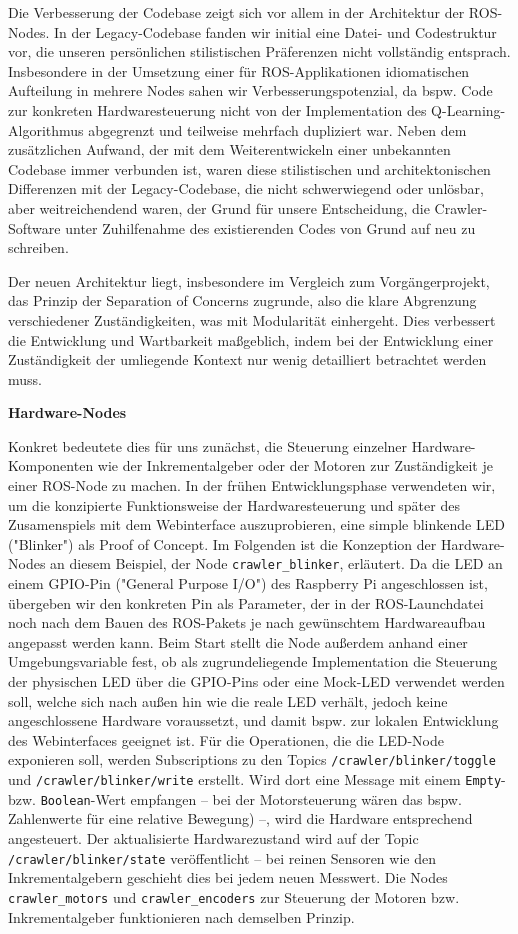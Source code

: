 Die Verbesserung der Codebase zeigt sich vor allem in der Architektur der ROS-Nodes. In der Legacy-Codebase fanden wir initial eine Datei- und Codestruktur vor, die unseren persönlichen stilistischen Präferenzen nicht vollständig entsprach. Insbesondere in der Umsetzung einer für ROS-Applikationen idiomatischen Aufteilung in mehrere Nodes sahen wir Verbesserungspotenzial, da bspw. Code zur konkreten Hardwaresteuerung nicht von der Implementation des Q-Learning-Algorithmus abgegrenzt und teilweise mehrfach dupliziert war. Neben dem zusätzlichen Aufwand, der mit dem Weiterentwickeln einer unbekannten Codebase immer verbunden ist, waren diese stilistischen und architektonischen Differenzen mit der Legacy-Codebase, die nicht schwerwiegend oder unlösbar, aber weitreichendend waren, der Grund für unsere Entscheidung, die Crawler-Software unter Zuhilfenahme des existierenden Codes von Grund auf neu zu schreiben. 

Der neuen Architektur liegt, insbesondere im Vergleich zum Vorgängerprojekt, das Prinzip der Separation of Concerns zugrunde, also die klare Abgrenzung verschiedener Zuständigkeiten, was mit Modularität einhergeht. Dies verbessert die Entwicklung und Wartbarkeit maßgeblich, indem bei der Entwicklung einer Zuständigkeit der umliegende Kontext nur wenig detailliert betrachtet werden muss. 

\textbf{Hardware-Nodes}

Konkret bedeutete dies für uns zunächst, die Steuerung einzelner Hardware-Komponenten wie der Inkrementalgeber oder der Motoren zur Zuständigkeit je einer ROS-Node zu machen. In der frühen Entwicklungsphase verwendeten wir, um die konzipierte Funktionsweise der Hardwaresteuerung und später des Zusamenspiels mit dem Webinterface auszuprobieren, eine simple blinkende LED ("Blinker") als Proof of Concept. Im Folgenden ist die Konzeption der Hardware-Nodes an diesem Beispiel, der Node \texttt{crawler\_blinker}, erläutert. Da die LED an einem GPIO-Pin ("General Purpose I/O") des Raspberry Pi angeschlossen ist, übergeben wir den konkreten Pin als Parameter, der in der ROS-Launchdatei noch nach dem Bauen des ROS-Pakets je nach gewünschtem Hardwareaufbau angepasst werden kann. Beim Start stellt die Node außerdem anhand einer Umgebungsvariable fest, ob als zugrundeliegende Implementation die Steuerung der physischen LED über die GPIO-Pins oder eine Mock-LED verwendet werden soll, welche sich nach außen hin wie die reale LED verhält, jedoch keine angeschlossene Hardware voraussetzt, und damit bspw. zur lokalen Entwicklung des Webinterfaces geeignet ist. Für die Operationen, die die LED-Node exponieren soll, werden Subscriptions zu den Topics \texttt{/crawler/blinker/toggle} und \texttt{/crawler/blinker/write} erstellt. Wird dort eine Message mit einem \texttt{Empty}- bzw. \texttt{Boolean}-Wert empfangen -- bei der Motorsteuerung wären das bspw. Zahlenwerte für eine relative Bewegung) \mbox{--,} wird die Hardware entsprechend angesteuert. Der aktualisierte Hardwarezustand wird auf der Topic \texttt{/crawler/blinker/state} veröffentlicht -- bei reinen Sensoren wie den Inkrementalgebern geschieht dies bei jedem neuen Messwert. Die Nodes \texttt{crawler\_motors} und \texttt{crawler\_encoders} zur Steuerung der Motoren bzw. Inkrementalgeber funktionieren nach demselben Prinzip.

